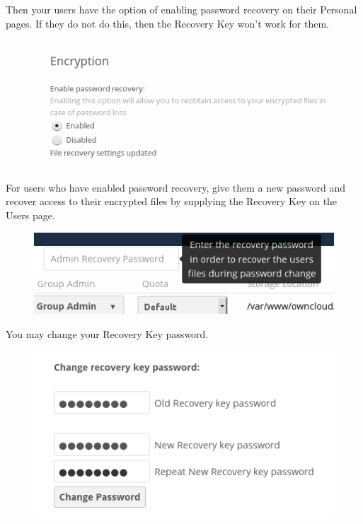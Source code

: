 \documentclass[letterpaper,10pt,english]{sphinxmanual}
\begin{document}
Then your users have the option of enabling password recovery on their Personal
pages. If they do not do this, then the Recovery Key won't work for them.
\begin{figure}[htbp]
\centering

\includegraphics{encryption7.png}
\end{figure}

For users who have enabled password recovery, give them a new password and
recover access to their encrypted files by supplying the Recovery Key on the
Users page.
\begin{figure}[htbp]
\centering

\includegraphics{encryption8.png}
\end{figure}

You may change your Recovery Key password.
\begin{figure}[htbp]
\centering

\includegraphics{encryption12.png}
\end{figure}
\end{document}
